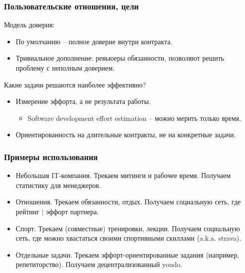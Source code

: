 \documentclass[11pt,handout,pdf,hyperref={unicode}]{beamer}
\begin{document}
\begin{frame}
  \frametitle{Пользовательские отношения, цели}

  Модель доверия:
  \begin{itemize}
  \item По умолчанию -- полное доверие внутри контракта.
  \item Тривиальное дополнение: ревьюеры обязанности, позволяют решить
    проблему с неполным доверием.
  \end{itemize}

  Какие задачи решаются наиболее эффективно?
  \begin{itemize}
  \item Измерение эффорта, а не результата работы.
    \begin{itemize}
    \item Software development effort estimation -- можно мерить только время.
    \end{itemize}
  \item Ориентированность на длительные контракты, не на конкретные задачи.
  \end{itemize}

\end{frame}

\begin{frame}
  \frametitle{Примеры использования}

  \begin{itemize}
    \item Небольшая IT-компания. Трекаем митинги и рабочее
      время. Получаем статистику для менеджеров.
    \item Отношения. Трекаем обязанности, отдых. Получаем социальную
      сеть, где рейтинг $\mid$ эффорт партнера.
    \item Спорт. Трекаем (совместные) тренировки, лекции. Получаем
      социальную сеть, где можно хвастаться своими спортивными
      скиллами (a.k.a. strava).
    \item Отдельные задачи. Трекаем эффорт-ориентированные задания
      (например, репетиторство). Получаем децентрализованный youdo.
  \end{itemize}
\end{frame}
\end{document}
